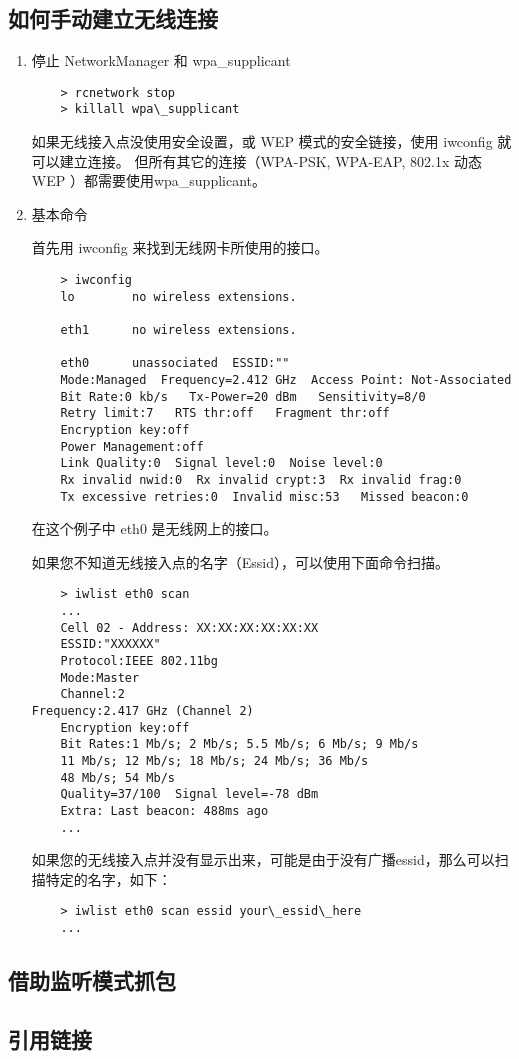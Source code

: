 \subsection{如何手动建立无线连接}
\begin{enumerate}
\item 停止 NetworkManager 和 wpa\_supplicant
\begin{verbatim}
	> rcnetwork stop
	> killall wpa\_supplicant
\end{verbatim}
  如果无线接入点没使用安全设置，或 WEP 模式的安全链接，使用 iwconfig 就可以建立连接。
  但所有其它的连接（WPA-PSK, WPA-EAP, 802.1x 动态 WEP ）都需要使用wpa\_supplicant。

\item 基本命令

  首先用 iwconfig 来找到无线网卡所使用的接口。
\begin{verbatim}
	> iwconfig
	lo        no wireless extensions.

	eth1      no wireless extensions.

	eth0      unassociated  ESSID:""
	Mode:Managed  Frequency=2.412 GHz  Access Point: Not-Associated
	Bit Rate:0 kb/s   Tx-Power=20 dBm   Sensitivity=8/0
	Retry limit:7   RTS thr:off   Fragment thr:off
	Encryption key:off
	Power Management:off
	Link Quality:0  Signal level:0  Noise level:0
	Rx invalid nwid:0  Rx invalid crypt:3  Rx invalid frag:0
	Tx excessive retries:0  Invalid misc:53   Missed beacon:0
\end{verbatim}

  在这个例子中 eth0 是无线网上的接口。

  如果您不知道无线接入点的名字（Essid），可以使用下面命令扫描。
\begin{verbatim}
	> iwlist eth0 scan
	...
	Cell 02 - Address: XX:XX:XX:XX:XX:XX
	ESSID:"XXXXXX"
	Protocol:IEEE 802.11bg
	Mode:Master
	Channel:2
Frequency:2.417 GHz (Channel 2)
	Encryption key:off
	Bit Rates:1 Mb/s; 2 Mb/s; 5.5 Mb/s; 6 Mb/s; 9 Mb/s
	11 Mb/s; 12 Mb/s; 18 Mb/s; 24 Mb/s; 36 Mb/s
	48 Mb/s; 54 Mb/s
	Quality=37/100  Signal level=-78 dBm
	Extra: Last beacon: 488ms ago
	...
\end{verbatim}

  如果您的无线接入点并没有显示出来，可能是由于没有广播essid，那么可以扫描特定的名字，如下：

\begin{verbatim}
	> iwlist eth0 scan essid your\_essid\_here
	...
\end{verbatim}
\end{enumerate}

\subsection{借助监听模式抓包}
\subsection{引用链接}



